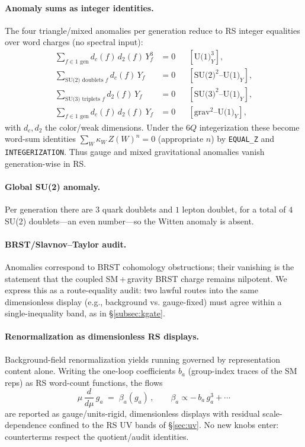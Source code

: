 \documentclass[11pt]{article}
\begin{document}
\paragraph{Anomaly sums as integer identities.}
The four triangle/mixed anomalies per generation reduce to RS integer equalities over word charges (no spectral input):
\begin{align}
\sum_{f\in \text{1 gen}} d_c(f)\,d_2(f)\,Y_f^3 &= 0 && [\text{U(1)}_Y^3],\\
\sum_{\text{SU(2) doublets } f} d_c(f)\,Y_f &= 0 && [\text{SU(2)}^2\!\text{--U(1)}_Y],\\
\sum_{\text{SU(3) triplets } f} d_2(f)\,Y_f &= 0 && [\text{SU(3)}^2\!\text{--U(1)}_Y],\\
\sum_{f\in \text{1 gen}} d_c(f)\,d_2(f)\,Y_f &= 0 && [\text{grav}^2\!\text{--U(1)}_Y],
\end{align}
with $d_c,d_2$ the color/weak dimensions. Under the $6Q$ integerization these become word-sum identities $\sum_W \kappa_W\,Z(W)^n=0$ (appropriate $n$) by \texttt{EQUAL\_Z} and \texttt{INTEGERIZATION}. Thus gauge and mixed gravitational anomalies vanish generation-wise in RS.

\paragraph{Global SU(2) anomaly.}
Per generation there are $3$ quark doublets and $1$ lepton doublet, for a total of $4$ SU(2) doublets—an even number—so the Witten anomaly is absent.

\paragraph{BRST/Slavnov--Taylor audit.}
Anomalies correspond to BRST cohomology obstructions; their vanishing is the statement that the coupled SM\,+\,gravity BRST charge remains nilpotent. We express this as a route-equality audit: two lawful routes into the same dimensionless display (e.g., background vs. gauge-fixed) must agree within a single-inequality band, as in \S\ref{subsec:kgate}.

\paragraph{Renormalization as dimensionless RS displays.}
Background-field renormalization yields running governed by representation content alone. Writing the one-loop coefficients $b_a$ (group-index traces of the SM reps) as RS word-count functions, the flows
\[
\mu\,\frac{d}{d\mu}\,g_a \;=\; \beta_a(g_a)\,,\qquad \beta_a\propto -\,b_a\,g_a^3+\cdots
\]
are reported as gauge/units-rigid, dimensionless displays with residual scale-dependence confined to the RS UV bands of \S\ref{sec:uv}. No new knobs enter: counterterms respect the quotient/audit identities.
\end{document}
